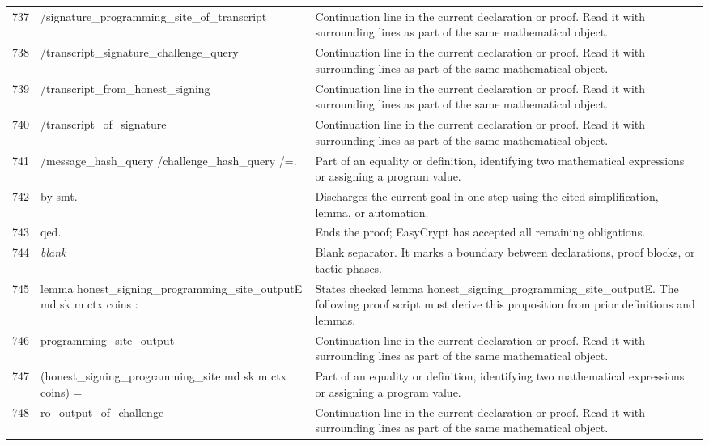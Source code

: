 \documentclass[10pt]{article}
\begin{document}
\begin{longtable}{r L{0.53\textwidth} L{0.37\textwidth}}
737 & {\ttfamily\scriptsize         /signature\_programming\_site\_of\_transcript} & Continuation line in the current declaration or proof.  Read it with surrounding lines as part of the same mathematical object. \\
738 & {\ttfamily\scriptsize         /transcript\_signature\_challenge\_query} & Continuation line in the current declaration or proof.  Read it with surrounding lines as part of the same mathematical object. \\
739 & {\ttfamily\scriptsize         /transcript\_from\_honest\_signing} & Continuation line in the current declaration or proof.  Read it with surrounding lines as part of the same mathematical object. \\
740 & {\ttfamily\scriptsize         /transcript\_of\_signature} & Continuation line in the current declaration or proof.  Read it with surrounding lines as part of the same mathematical object. \\
741 & {\ttfamily\scriptsize         /message\_hash\_query /challenge\_hash\_query /=.} & Part of an equality or definition, identifying two mathematical expressions or assigning a program value. \\
742 & {\ttfamily\scriptsize by smt.} & Discharges the current goal in one step using the cited simplification, lemma, or automation. \\
743 & {\ttfamily\scriptsize qed.} & Ends the proof; EasyCrypt has accepted all remaining obligations. \\
744 & {\ttfamily\scriptsize \emph{blank}} & Blank separator.  It marks a boundary between declarations, proof blocks, or tactic phases. \\
745 & {\ttfamily\scriptsize lemma honest\_signing\_programming\_site\_outputE md sk m ctx coins :} & States checked lemma honest\_signing\_programming\_site\_outputE.  The following proof script must derive this proposition from prior definitions and lemmas. \\
746 & {\ttfamily\scriptsize   programming\_site\_output} & Continuation line in the current declaration or proof.  Read it with surrounding lines as part of the same mathematical object. \\
747 & {\ttfamily\scriptsize     (honest\_signing\_programming\_site md sk m ctx coins) =} & Part of an equality or definition, identifying two mathematical expressions or assigning a program value. \\
748 & {\ttfamily\scriptsize   ro\_output\_of\_challenge} & Continuation line in the current declaration or proof.  Read it with surrounding lines as part of the same mathematical object. \\

\end{longtable}
\end{document}
